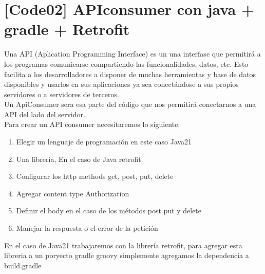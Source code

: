 \section{[Code02] APIconsumer con java + gradle + Retrofit}

Una API (Aplication Programming Interface) es un una interfase que permitirá a los programas comunicarse compartiendo las funcionalidades, datos, etc. Esto facilita a los desarrolladores a disponer de muchas herramientas y base de datos disponibles y usarlos en sus aplicaciones ya sea conectándose a sus propios servidores o a servidores de terceros.
\\
Un ApiConsumer sera esa parte del código que nos permitirá conectarnos a una API del lado del servidor.\\
Para crear un API consumer necesitaremos lo siguiente:
\begin{enumerate}
  \item Elegir un lenguaje de programación en este caso Java21
  \item Una librería, En el caso de Java retrofit
  \item Configurar los http methods get, post, put, delete
  \item Agregar content type Authorization
  \item Definir el body en el caso de los métodos post put y delete
  \item Manejar la respuesta o el error de la petición
\end{enumerate}
En el caso de Java21 trabajaremos con la librería retrofit, para agregar esta libreria a un poryecto gradle groovy simplemente agregamos la dependencia a build.gradle

